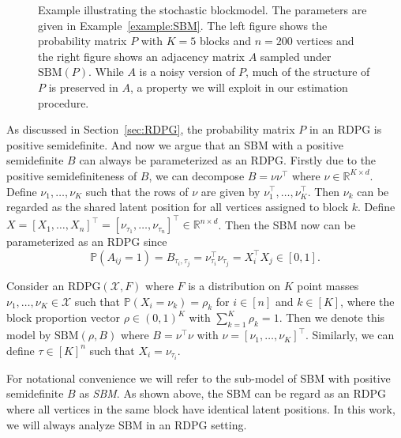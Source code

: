 \begin{figure}
\begin{subfigure}{.45\textwidth}
\end{subfigure}
\caption{Example illustrating the stochastic blockmodel. The parameters are given in Example~\ref{example:SBM}.
The left figure shows the probability matrix $P$ with $K = 5$ blocks and $n=200$ vertices and the right figure shows an adjacency matrix $A$ sampled under $\mathrm{SBM}(P)$.
While $A$ is a noisy version of $P$, much of the structure of $P$ is preserved in $A$, a property we will exploit in our estimation procedure.}
\label{fig:SBM_example}
\end{figure}

As discussed in Section~\ref{sec:RDPG}, the probability matrix $P$ in an RDPG is positive semidefinite. And now we argue that an SBM with a positive semidefinite $B$ can always be parameterized as an RDPG.
Firstly due to the positive semidefiniteness of $B$, we can decompose $B = \nu \nu^{\top}$ where $\nu \in \mathbb{R}^{K \times d}$. Define $\nu_1, \dots, \nu_K$ such that the rows of $\nu$ are given by $\nu_1^{\top}, \dots, \nu_K^{\top}$. Then $\nu_k$ can be regarded as the shared latent position for all vertices assigned to block $k$. Define $X = [X_1, \dots, X_n]^{\top} = [\nu_{\tau_1}, \dots, \nu_{\tau_n}]^{\top} \in \mathbb{R}^{n \times d}$. Then the SBM now can be parameterized as an RDPG since
\[
	\mathbb{P}(A_{ij} = 1) = B_{\tau_i, \tau_j} = \nu_{\tau_i}^{\top} \nu_{\tau_j}^{\phantom{\top}} = X_i^{\top} X_j \in [0, 1].
\]


\begin{definition} 
\label{def:SBM_RDPG}
Consider an $\mathrm{RDPG}(\mathcal{X}, F)$ where $F$ is a distribution on $K$ point masses $\nu_1, \dots, \nu_K \in \mathcal{X}$ such that $\mathbb{P}(X_i = \nu_k) = \rho_k$ for $i \in [n]$ and $k \in [K]$, where the block proportion vector $\rho \in (0,1)^K$ with $\sum_{k=1}^K \rho_k = 1$. Then we denote this model by $\mathrm{SBM}(\rho, B)$ where $B = \nu^{\top} \nu$ with $\nu = [\nu_1, \dots, \nu_K]^{\top}$. Similarly, we can define $\tau \in [K]^n$ such that $X_i = \nu_{\tau_i}$. 
\end{definition}

For notational convenience we will refer to the sub-model of SBM with positive semidefinite $B$ as {\em{SBM}}.
As shown above, the SBM can be regard as an RDPG where all vertices in the same block have identical latent positions. In this work, we will always analyze SBM in an RDPG setting.



